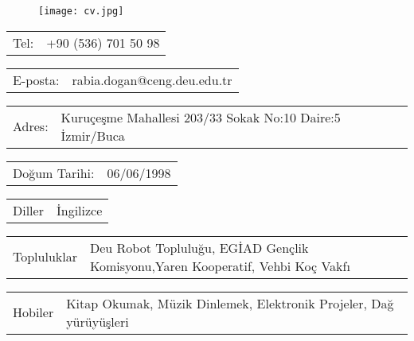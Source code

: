 \documentclass[10pt,A4]{article}
\newcommand{\tzlarrow}{(0,0) -- (0.2,0) -- (0.3,0.2) -- (0.2,0.4) -- (0,0.4) -- (0.1,0.2) -- cycle;}
\newcommand{\larrow}[1]
{\begin{tikzpicture}[scale=0.58]
	 \filldraw[fill=#1!100,draw=#1!100!black]  \tzlarrow
 \end{tikzpicture}
}
\newcommand{\metasection}[2]
{
\begin{tabular*}{1\textwidth}{p{2.7cm} p{11cm}}
\larrow{bgcol}	\normalsize{\textcolor{sectcol}{#1}}&#2\\[12pt]
\end{tabular*}
}
\begin{document}
\pagestyle{fancy}	


\vspace{-20.55pt}


\hspace{-0.25\linewidth}\colorbox{bgcol}{}


\vspace{10pt}
\begin{figure}[H]
\hspace{0.8\linewidth}
	\texttt{[image: cv.jpg]}	%
\end{figure}



\vspace{-130pt}
\metasection{Tel:}{+90 (536) 701 50 98 }
\metasection{E-posta:}{rabia.dogan@ceng.deu.edu.tr} 
\metasection{Adres:}{Kuruçeşme Mahallesi 203/33 Sokak No:10 Daire:5 İzmir/Buca}
\metasection{Doğum Tarihi:}{06/06/1998}
\metasection{Diller}{İngilizce}
\metasection{Topluluklar}{Deu Robot Topluluğu, EGİAD Gençlik Komisyonu,Yaren Kooperatif, Vehbi Koç Vakfı}
\metasection{Hobiler}{Kitap Okumak, Müzik Dinlemek, Elektronik Projeler, Dağ yürüyüşleri}
\end{document}
